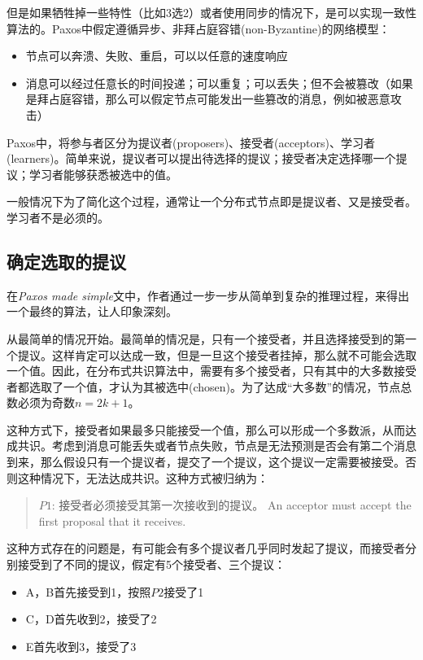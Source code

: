 \documentclass[12pt]{article}
\begin{document}
但是如果牺牲掉一些特性（比如3选2）或者使用同步的情况下，是可以实现一致性算法的。Paxos中假定遵循异步、非拜占庭容错(non-Byzantine)的网络模型：

\begin{itemize}
\tightlist
\item
  节点可以奔溃、失败、重启，可以以任意的速度响应
\item
  消息可以经过任意长的时间投递；可以重复；可以丢失；但不会被篡改（如果是拜占庭容错，那么可以假定节点可能发出一些篡改的消息，例如被恶意攻击）
\end{itemize}

Paxos中，将参与者区分为提议者(proposers)、接受者(acceptors)、学习者(learners)。简单来说，提议者可以提出待选择的提议；接受者决定选择哪一个提议；学习者能够获悉被选中的值。

一般情况下为了简化这个过程，通常让一个分布式节点即是提议者、又是接受者。学习者不是必须的。

\subsection{确定选取的提议}\label{ux786eux5b9aux9009ux53d6ux7684ux63d0ux8bae}

在\emph{Paxos made simple}文中，作者通过一步一步从简单到复杂的推理过程，来得出一个最终的算法，让人印象深刻。

从最简单的情况开始。最简单的情况是，只有一个接受者，并且选择接受到的第一个提议。这样肯定可以达成一致，但是一旦这个接受者挂掉，那么就不可能会选取一个值。因此，在分布式共识算法中，需要有多个接受者，只有其中的大多数接受者都选取了一个值，才认为其被选中(chosen)。为了达成``大多数''的情况，节点总数必须为奇数\(n = 2k + 1\)。

这种方式下，接受者如果最多只能接受一个值，那么可以形成一个多数派，从而达成共识。考虑到消息可能丢失或者节点失败，节点是无法预测是否会有第二个消息到来，那么假设只有一个提议者，提交了一个提议，这个提议一定需要被接受。否则这种情况下，无法达成共识。这种方式被归纳为：

\begin{quote}
\(P1\): 接受者必须接受其第一次接收到的提议。 An acceptor must accept the first proposal that it receives.
\end{quote}

这种方式存在的问题是，有可能会有多个提议者几乎同时发起了提议，而接受者分别接受到了不同的提议，假定有5个接受者、三个提议：

\begin{itemize}
\tightlist
\item
  A，B首先接受到1，按照\(P2\)接受了1
\item
  C，D首先收到2，接受了2
\item
  E首先收到3，接受了3
\end{itemize}
\end{document}
